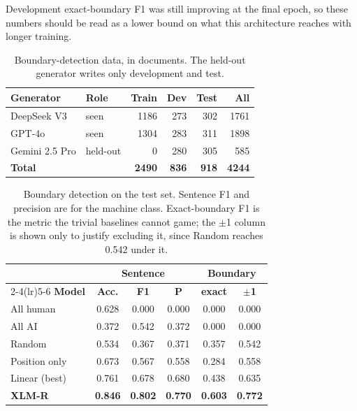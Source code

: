 \documentclass[11pt]{article}
\begin{document}
Development exact-boundary F1 was still improving at the final epoch, so these numbers should be read as a lower bound on what this architecture reaches with longer training.

\begin{table}[t]
\centering
\small
\begin{tabular}{llrrrr}
\toprule
\textbf{Generator} & \textbf{Role} & \textbf{Train} & \textbf{Dev} & \textbf{Test} & \textbf{All} \\
\midrule
DeepSeek V3    & seen     & 1186 & 273 & 302 & 1761 \\
GPT-4o         & seen     & 1304 & 283 & 311 & 1898 \\
Gemini 2.5 Pro & held-out & 0    & 280 & 305 & 585 \\
\midrule
\textbf{Total} &          & \textbf{2490} & \textbf{836} & \textbf{918} & \textbf{4244} \\
\bottomrule
\end{tabular}
\caption{Boundary-detection data, in documents. The held-out generator writes only development and test.}
\label{tab:boundary-data}
\end{table}

\begin{table}[t]
\centering
\small
\setlength{\tabcolsep}{4pt}
\begin{tabular}{lccccc}
\toprule
& \multicolumn{3}{c}{\textbf{Sentence}} & \multicolumn{2}{c}{\textbf{Boundary}} \\
\cmidrule(lr){2-4}\cmidrule(lr){5-6}
\textbf{Model} & \textbf{Acc.} & \textbf{F1} & \textbf{P} & \textbf{exact} & \textbf{$\pm$1} \\
\midrule
All human & 0.628 & 0.000 & 0.000 & 0.000 & 0.000 \\
All AI & 0.372 & 0.542 & 0.372 & 0.000 & 0.000 \\
Random & 0.534 & 0.367 & 0.371 & 0.357 & 0.542 \\
Position only & 0.673 & 0.567 & 0.558 & 0.284 & 0.558 \\
Linear (best) & 0.761 & 0.678 & 0.680 & 0.438 & 0.635 \\
\textbf{XLM-R} & \textbf{0.846} & \textbf{0.802} & \textbf{0.770} & \textbf{0.603} & \textbf{0.772} \\
\bottomrule
\end{tabular}
\caption{Boundary detection on the test set. Sentence F1 and precision are for the machine class. Exact-boundary F1 is the metric the trivial baselines cannot game; the $\pm$1 column is shown only to justify excluding it, since Random reaches 0.542 under it.}
\label{tab:boundary-main}
\end{table}
\end{document}
